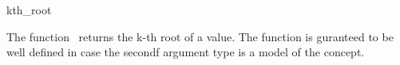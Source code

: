 \begin{ccRefFunction}{kth_root}

\ccDefinition

The function \ccRefName\ returns the k-th root of a value.
The function is guranteed to be well defined in case the secondf argument type 
is a model of the  concept. 


{}


\ccSeeAlso

\\
\\


\end{ccRefFunction}
